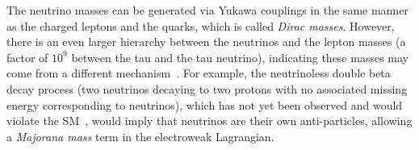 The neutrino masses can be generated via Yukawa couplings in the same manner as the charged leptons and the quarks, which is called \textit{Dirac masses}.
However, there is an even larger hierarchy between the neutrinos and the lepton masses (a factor of $10^9$ between the tau and the tau neutrino), indicating these masses may come from a different mechanism~\cite{King:2003jb}.
For example, the neutrinoless double beta decay process (two neutrinos decaying to two protons with no associated missing energy corresponding to neutrinos), which has not yet been observed and would violate the SM~\cite{Schwingenheuer:2012zs}, would imply that neutrinos are their own anti-particles, allowing a \textit{Majorana mass} term in the electroweak Lagrangian.




